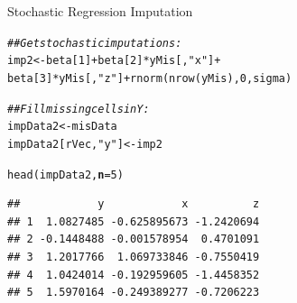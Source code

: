 \documentclass{beamer}\usepackage[]{graphicx}\usepackage[]{color}
\makeatletter
\newcommand{\hlnum}[1]{\textcolor[rgb]{0.69,0.494,0}{#1}}%
\newcommand{\hlstr}[1]{\textcolor[rgb]{0.749,0.012,0.012}{#1}}%
\newcommand{\hlcom}[1]{\textcolor[rgb]{0.514,0.506,0.514}{\textit{#1}}}%
\newcommand{\hlopt}[1]{\textcolor[rgb]{0,0,0}{#1}}%
\newcommand{\hlstd}[1]{\textcolor[rgb]{0,0,0}{#1}}%
\newcommand{\hlkwb}[1]{\textcolor[rgb]{0,0.341,0.682}{#1}}%
\newcommand{\hlkwc}[1]{\textcolor[rgb]{0,0,0}{\textbf{#1}}}%
\newcommand{\hlkwd}[1]{\textcolor[rgb]{0.004,0.004,0.506}{#1}}%
\newenvironment{kframe}{%
 \def\at@end@of@kframe{}%
 \ifinner\ifhmode%
  \def\at@end@of@kframe{\end{minipage}}%
  \begin{minipage}{\columnwidth}%
 \fi\fi%
 \def\FrameCommand##1{\hskip\@totalleftmargin \hskip-\fboxsep
 \colorbox{shadecolor}{##1}\hskip-\fboxsep
     \hskip-\linewidth \hskip-\@totalleftmargin \hskip\columnwidth}%
 \MakeFramed {\advance\hsize-\width
   \@totalleftmargin\z@ \linewidth\hsize
   \@setminipage}}%
 {\par\unskip\endMakeFramed%
 \at@end@of@kframe}
\newenvironment{knitrout}{}{} %
\makeatother
\begin{document}

\begin{frame}[fragile]{Stochastic Regression Imputation}
    
\begin{knitrout}\footnotesize
{}\color{fgcolor}\begin{kframe}
\begin{alltt}
\hlcom{## Get stochastic imputations:}
\hlstd{imp2} \hlkwb{<-} \hlstd{beta[}\hlnum{1}\hlstd{]} \hlopt{+} \hlstd{beta[}\hlnum{2}\hlstd{]} \hlopt{*} \hlstd{yMis[ ,} \hlstr{"x"}\hlstd{]} \hlopt{+}
    \hlstd{beta[}\hlnum{3}\hlstd{]} \hlopt{*} \hlstd{yMis[ ,} \hlstr{"z"}\hlstd{]} \hlopt{+} \hlkwd{rnorm}\hlstd{(}\hlkwd{nrow}\hlstd{(yMis),} \hlnum{0}\hlstd{, sigma)}

\hlcom{## Fill missing cells in Y:}
\hlstd{impData2}            \hlkwb{<-} \hlstd{misData}
\hlstd{impData2[rVec,} \hlstr{"y"}\hlstd{]} \hlkwb{<-} \hlstd{imp2}

\hlkwd{head}\hlstd{(impData2,} \hlkwc{n} \hlstd{=} \hlnum{5}\hlstd{)}
\end{alltt}
\begin{verbatim}
##            y            x          z
## 1  1.0827485 -0.625895673 -1.2420694
## 2 -0.1448488 -0.001578954  0.4701091
## 3  1.2017766  1.069733846 -0.7550419
## 4  1.0424014 -0.192959605 -1.4458352
## 5  1.5970164 -0.249389277 -0.7206223
\end{verbatim}
\end{kframe}
\end{knitrout}

\end{frame}

\watermarkon %
\end{document}
